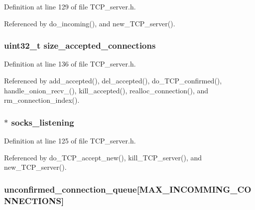 Definition at line 129 of file T\+C\+P\+\_\+server.\+h.



Referenced by do\+\_\+incoming(), and new\+\_\+\+T\+C\+P\+\_\+server().

\hypertarget{struct_t_c_p___server_a6348c77f7067c2876de893aedb559972}{
\subsubsection[{size\+\_\+accepted\+\_\+connections}]{\setlength{\rightskip}{0pt plus 5cm}uint32\+\_\+t size\+\_\+accepted\+\_\+connections}}\label{struct_t_c_p___server_a6348c77f7067c2876de893aedb559972}


Definition at line 136 of file T\+C\+P\+\_\+server.\+h.



Referenced by add\+\_\+accepted(), del\+\_\+accepted(), do\+\_\+\+T\+C\+P\+\_\+confirmed(), handle\+\_\+onion\+\_\+recv\+\_(), kill\+\_\+accepted(), realloc\+\_\+connection(), and rm\+\_\+connection\+\_\+index().

\hypertarget{struct_t_c_p___server_a120d7e1abddb3a838bc0d0442f4ad8e6}{
\subsubsection[{socks\+\_\+listening}]{$\ast$ socks\+\_\+listening}}\label{struct_t_c_p___server_a120d7e1abddb3a838bc0d0442f4ad8e6}


Definition at line 125 of file T\+C\+P\+\_\+server.\+h.



Referenced by do\+\_\+\+T\+C\+P\+\_\+accept\+\_\+new(), kill\+\_\+\+T\+C\+P\+\_\+server(), and new\+\_\+\+T\+C\+P\+\_\+server().

\hypertarget{struct_t_c_p___server_a8e84d42c724209bf3967de32506beeba}{
\subsubsection[{unconfirmed\+\_\+connection\+\_\+queue}]{ unconfirmed\+\_\+connection\+\_\+queue\mbox{[}{\bf M\+A\+X\+\_\+\+I\+N\+C\+O\+M\+M\+I\+N\+G\+\_\+\+C\+O\+N\+N\+E\+C\+T\+I\+O\+N\+S}\mbox{]}}}\label{struct_t_c_p___server_a8e84d42c724209bf3967de32506beeba}


